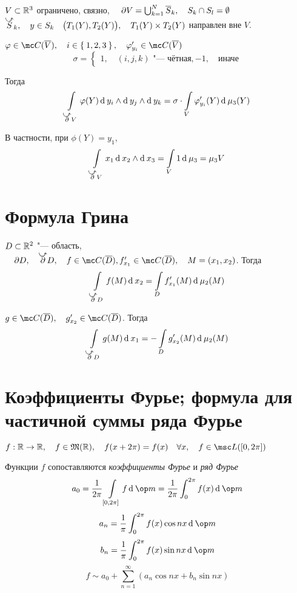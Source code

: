 \begin{theorem}
	$ V \subset \mathbb{R}^3 $ ограничено, связно, $ \quad \partial V = \bigcup_{k = 1}^N \overline S_k, \quad S_k \cap S_l = \emptyset $ \\
	$ \curvedir S_k, \quad y \in S_k \quad \bigl( T_1(Y), T_2(Y) \bigr), \quad T_1(Y) \times T_2(Y) $ направлен вне $ V $.

	$ \phi \in \mc C(\ol V), \quad i \in \set{1, 2, 3}, \quad \phi_{y_i}' \in \mc C(\ol V) $
	$$ \sigma =
	\begin{cases}
		1, \quad (i, j, k) \text{ "--- чётная},
		-1, \quad \text{иначе}
	\end{cases} $$

	Тогда
	$$ \int\limits_{\curvedir \partial V} \phi(Y) \di y_i \wedge \di y_j \wedge \di y_k = \sigma \cdot \int\limits_V \phi_{y_i}'(Y) \di \mu_3(Y) $$

	В частности, при $ \phi(Y) = y_1 $,
	$$ \int\limits_{\curvedir \partial V} x_1 \di x_2 \wedge \di x_3 = \int\limits_V 1 \di \mu_3 = \mu_3 V $$
\end{theorem}

\section{Формула Грина}

\begin{theorem}
	$ D \subset \mathbb{R}^2 $ "--- область, $ \quad \partial D, \quad \curvedir \partial D, \quad f \in \mc C(\ol D), f_{x_1}' \in \mc C(\ol D), \quad M = (x_1, x_2) $. Тогда
	$$ \int\limits_{\curvedir \partial D} f(M) \di x_2 = \int\limits_D f_{x_1}'(M) \di \mu_2(M) $$

	$ g \in \mc C(\ol D), \quad g_{x_2}' \in \mc C(\ol D) $. Тогда
	$$ \int\limits_{\curvedir \partial D} g(M) \di x_1 = - \int\limits_D g_{x_2}'(M) \di \mu_2(M) $$
\end{theorem}

\section{Коэффициенты Фурье; формула для частичной суммы ряда Фурье}

\begin{definition}
	$ f : \R \to \R, \quad f \in \mathfrak M(\R), \quad f(x + 2\pi) = f(x) \quad \forall x, \quad f \in \msc L([0, 2\pi]) $

	Функции $ f $ сопоставляются \emph{коэффициенты Фурье} и \emph{ряд Фурье}
	$$ a_0 = \frac1{2\pi} \int\limits_{[0, 2\pi]} f \di \op m = \frac1{2\pi} \int_0^{2\pi} f(x) \di \op m $$
	$$ a_n = \frac1\pi \int_0^{2\pi} f(x) \cos n x \di \op m $$
	$$ b_n = \frac1\pi \int_0^{2\pi} f(x) \sin nx \di \op m $$
	$$ f \sim a_0 + \sum_{n = 1}^\infty (a_n \cos nx + b_n \sin nx) $$
\end{definition}

